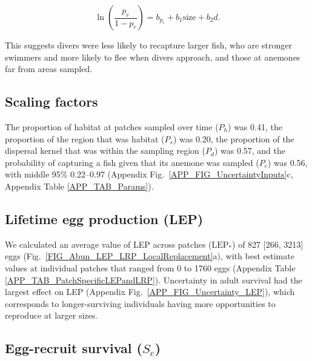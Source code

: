 \documentclass[12pt, oneside]{article}   	%
\begin{document}
\begin{equation}
\ln(\frac{p_r}{1-p_r}) = b_{p_r} + b_1\text{size} + b_2d. \label{APP_EQN_MARK_Recapture}
\end{equation}

This suggests divers were less likely to recapture larger fish, who are stronger swimmers and more likely to flee when divers approach, and those at anemones far from areas sampled.

\subsection{Scaling factors} \label{APP_SEC_RESULTS_ScalingFactors}

The proportion of habitat at patches sampled over time ($P_h$) was 0.41, the proportion of the region that was habitat ($P_s$) was 0.20, the proportion of the dispersal kernel that was within the sampling region ($P_d$) was 0.57, and the probability of capturing a fish given that its anemone was sampled ($P_c$) was 0.56, with middle 95\% 0.22--0.97 (Appendix Fig.\ \ref{APP_FIG_UncertaintyInputs}c, Appendix Table \ref{APP_TAB_Params}).

\subsection{Lifetime egg production (LEP)} \label{APP_SEC_RESULTS_LEP}  %
We calculated an average value of LEP across patches ($\text{LEP}_*$) of 827 [266, 3213] eggs (Fig.\ \ref{FIG_Abun_LEP_LRP_LocalReplacement}a), with best estimate values at individual patches that ranged from 0 to 1760 eggs (Appendix Table \ref{APP_TAB_PatchSpecificLEPandLRP}). Uncertainty in adult survival had the largest effect on LEP (Appendix Fig.\ \ref{APP_FIG_Uncertainty_LEP}), which corresponds to longer-surviving individuals having more opportunities to reproduce at larger sizes. 

\subsection{Egg-recruit survival ($S_e$)} \label{APP_SEC_RESULTS_Egg-recruit_survival}  %
\end{document}
